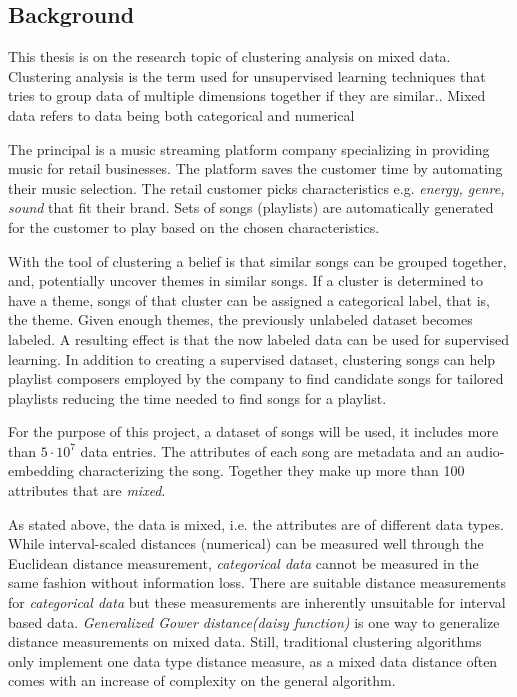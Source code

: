 \documentclass[a4paper,11pt]{article}
\begin{document}
\subsection{Background}

This thesis is on the research topic of clustering analysis on mixed data. Clustering analysis is the term used for unsupervised learning
techniques that tries to group data of multiple dimensions together if
they are similar.\cite{doi:10.1002/9780470316801.ch1}. Mixed data refers to data being both categorical and numerical \cite{doi:10.1002/9780470316801.ch1,Jia2018,CHEUNG20132228,CHEN2016271}

The principal is a music streaming platform
company specializing in providing music for retail businesses. The
platform saves the customer time by automating their music selection. The
retail customer picks characteristics e.g. \textit{energy, genre, sound} that fit their brand. Sets of songs (playlists) are automatically generated for the customer to play based on the chosen characteristics.

With the tool of clustering a belief is that
similar songs can be grouped together, and, potentially uncover themes
in similar songs. If a cluster is determined to have a theme, songs of that
cluster can be assigned a categorical label, that is, the theme. Given
enough themes, the previously unlabeled dataset becomes labeled. A resulting effect is
that the now labeled data can be used for supervised learning. In addition to creating a supervised dataset, clustering songs can help playlist composers employed by the company to find candidate songs for tailored playlists reducing the time needed to find songs for a playlist.

For the purpose of this project, a dataset of songs will be used, it includes more than $5\cdot10^7$ data entries. The attributes of each song are metadata and an audio-embedding characterizing the song. Together they make up more than 100 attributes that are \textit{mixed}.

As stated above, the data is mixed, i.e. the attributes are of different
data types. While interval-scaled distances (numerical) can be measured well through
the Euclidean distance measurement, \textit{categorical data} cannot be measured in the same fashion without information loss.  There are suitable distance measurements for \textit{categorical data} but these measurements are inherently unsuitable for interval based data. \textit{Generalized Gower distance(daisy function)} \cite{doi:10.1002/9780470316801.ch1} is one way to generalize distance measurements on mixed data. Still, traditional clustering algorithms only implement one data type distance measure, as a mixed data distance often comes with an increase of complexity on the general algorithm. %
\end{document}
